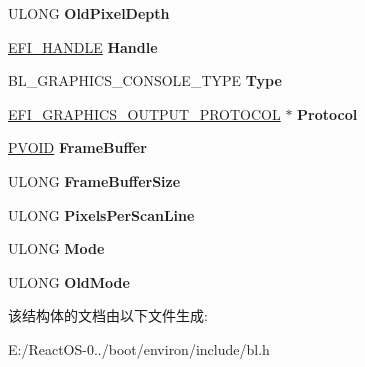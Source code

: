 \begin{DoxyCompactItemize}
\item 
\mbox{\label{struct___b_l___g_r_a_p_h_i_c_s___c_o_n_s_o_l_e_a0cbd66bd0876e3f5acff89945cd3e491}} 
U\+L\+O\+NG {\bfseries Old\+Pixel\+Depth}
\item 
\mbox{\label{struct___b_l___g_r_a_p_h_i_c_s___c_o_n_s_o_l_e_afd38c32c4145fcbd9a7434c4b29142b2}} 
\hyperlink{_uefi_base_type_8h_af943d518ce8a229e7e51ce3fed0e3122}{E\+F\+I\+\_\+\+H\+A\+N\+D\+LE} {\bfseries Handle}
\item 
\mbox{\label{struct___b_l___g_r_a_p_h_i_c_s___c_o_n_s_o_l_e_a2b9468b0bc122a9e509e9f89e56f2f55}} 
B\+L\+\_\+\+G\+R\+A\+P\+H\+I\+C\+S\+\_\+\+C\+O\+N\+S\+O\+L\+E\+\_\+\+T\+Y\+PE {\bfseries Type}
\item 
\mbox{\label{struct___b_l___g_r_a_p_h_i_c_s___c_o_n_s_o_l_e_a03e0916a01f04bf1a7d449914bf6add4}} 
\hyperlink{struct___e_f_i___g_r_a_p_h_i_c_s___o_u_t_p_u_t___p_r_o_t_o_c_o_l}{E\+F\+I\+\_\+\+G\+R\+A\+P\+H\+I\+C\+S\+\_\+\+O\+U\+T\+P\+U\+T\+\_\+\+P\+R\+O\+T\+O\+C\+OL} $\ast$ {\bfseries Protocol}
\item 
\mbox{\label{struct___b_l___g_r_a_p_h_i_c_s___c_o_n_s_o_l_e_aa88e8da99f67c6a4824175d8f10b9bd8}} 
\hyperlink{interfacevoid}{P\+V\+O\+ID} {\bfseries Frame\+Buffer}
\item 
\mbox{\label{struct___b_l___g_r_a_p_h_i_c_s___c_o_n_s_o_l_e_a1d72e3f8ff13f335282a34ddc19102b7}} 
U\+L\+O\+NG {\bfseries Frame\+Buffer\+Size}
\item 
\mbox{\label{struct___b_l___g_r_a_p_h_i_c_s___c_o_n_s_o_l_e_a683194ca568763d50377733937bd3e76}} 
U\+L\+O\+NG {\bfseries Pixels\+Per\+Scan\+Line}
\item 
\mbox{\label{struct___b_l___g_r_a_p_h_i_c_s___c_o_n_s_o_l_e_a03dda8cdfaa140e68d3527e0a4f4cbda}} 
U\+L\+O\+NG {\bfseries Mode}
\item 
\mbox{\label{struct___b_l___g_r_a_p_h_i_c_s___c_o_n_s_o_l_e_a327dc36116549742a5d9d770bae32abd}} 
U\+L\+O\+NG {\bfseries Old\+Mode}
\end{DoxyCompactItemize}


该结构体的文档由以下文件生成\+:\begin{DoxyCompactItemize}
\item 
E\+:/\+React\+O\+S-\/0../boot/environ/include/bl.\+h\end{DoxyCompactItemize}
